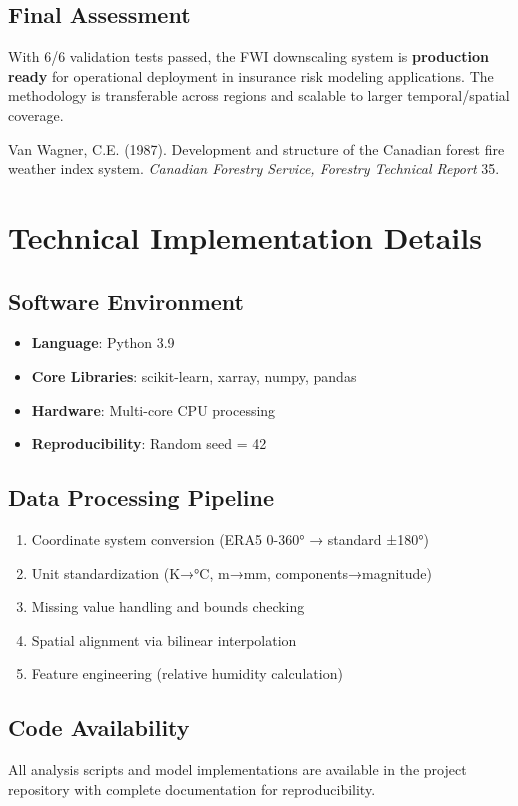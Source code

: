 \documentclass[11pt,a4paper]{article}
\begin{document}
\subsection{Final Assessment}
With 6/6 validation tests passed, the FWI downscaling system is \textbf{production ready} for operational deployment in insurance risk modeling applications. The methodology is transferable across regions and scalable to larger temporal/spatial coverage.


\begin{thebibliography}{1}

Van Wagner, C.E. (1987).
\newblock Development and structure of the Canadian forest fire weather index system.
\newblock \textit{Canadian Forestry Service, Forestry Technical Report} 35.

\end{thebibliography}

\appendix

\section{Technical Implementation Details}

\subsection{Software Environment}
\begin{itemize}
    \item \textbf{Language}: Python 3.9
    \item \textbf{Core Libraries}: scikit-learn, xarray, numpy, pandas
    \item \textbf{Hardware}: Multi-core CPU processing
    \item \textbf{Reproducibility}: Random seed = 42
\end{itemize}

\subsection{Data Processing Pipeline}
\begin{enumerate}
    \item Coordinate system conversion (ERA5 0-360° → standard ±180°)
    \item Unit standardization (K→°C, m→mm, components→magnitude)
    \item Missing value handling and bounds checking
    \item Spatial alignment via bilinear interpolation
    \item Feature engineering (relative humidity calculation)
\end{enumerate}

\subsection{Code Availability}
All analysis scripts and model implementations are available in the project repository with complete documentation for reproducibility.
\end{document}
